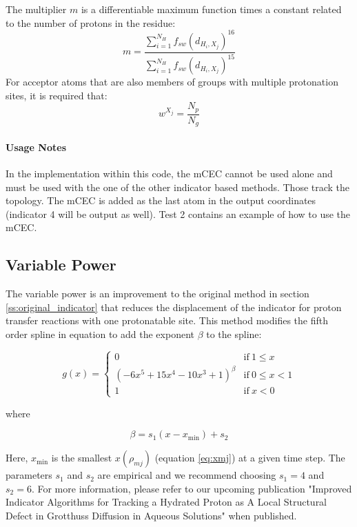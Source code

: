 \documentclass{article}
\begin{document}
The multiplier $m$ is a differentiable maximum function times a constant related to the number of protons in the residue:
\begin{equation}
m = \frac{\sum_{i=1}^{N_H} f_{sw}(d_{H_i,X_j})^{16}}{\sum_{i=1}^{N_H}  f_{sw}(d_{H_i,X_j})^{15}}
\end{equation}
For acceptor atoms that are also members of groups with multiple protonation sites, it is required that:
\begin{equation}
w^{X_j} = \frac{N_p}{N_g}
\end{equation}

\paragraph{Usage Notes}
In the implementation within this code, the mCEC cannot be used alone and must be used with the one of the other indicator based methods.
Those track the topology.
The mCEC is added as the last atom in the output coordinates (indicator 4 will be output as well).
Test 2 contains an example of how to use the mCEC.

\subsection{Variable Power}\label{ss:indicator12}
The variable power is an improvement to the original method in section \ref{ss:original_indicator} that reduces the displacement of the indicator for proton transfer reactions with one protonatable site.
This method modifies the fifth order spline in equation to add the exponent $\beta$ to the spline:

\begin{equation} \label{eq:gofx_vpow}
g(x) = \begin{cases}
0
& \mathrm{if}\ 1 \leq x \\
\left( -6x^5 + 15x^4 - 10x^3 + 1 \right) ^ \beta
& \mathrm{if}\  0 \leq x < 1 \\
1
& \mathrm{if}\ x < 0 
\end{cases}
\end{equation}

where

\begin{equation}
\beta = s_1 \left( x - x_{\mathrm{min}} \right) + s_2
\end{equation}

Here, $x_{\mathrm{min}}$ is the smallest $x(\rho_{mj})$ (equation \ref{eq:xmj}) at a given time step.
The parameters $s_1$ and $s_2$ are empirical and we recommend choosing $s_1 = 4$ and $s_2 = 6$.
For more information, please refer to our upcoming publication "Improved Indicator Algorithms for Tracking a Hydrated Proton as A Local Structural Defect in Grotthuss Diffusion in Aqueous Solutions" when published.
\end{document}
